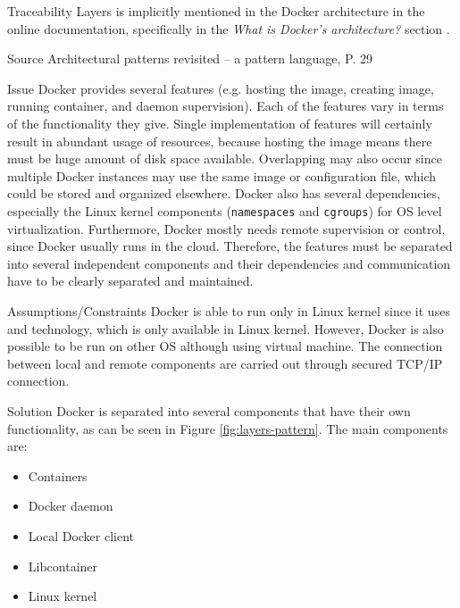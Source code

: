 \begin{patdescription}
\item [Traceability]
Layers is implicitly mentioned in the Docker architecture in the online
documentation, specifically in the \textit{What is Docker’s architecture?}
section \cite{dockerarchi}.

\item [Source]
Architectural patterns revisited -- a pattern language, P. 29
\cite{avgeriou2005architectural}

\item [Issue]
Docker provides several features (e.g. hosting the image, creating image, running container, and daemon supervision). Each of the features vary in terms of the functionality they give. Single implementation of features will certainly result in abundant usage of resources, because hosting the image means there must be huge amount of disk space available.
%
Overlapping may also occur since multiple Docker instances may use the same image or configuration file, which could be stored and organized elsewhere. Docker also has several dependencies, especially the Linux kernel components (\texttt{namespaces} and \texttt{cgroups}) for OS level virtualization.
Furthermore, Docker mostly needs remote supervision or control, since Docker usually runs in the cloud. Therefore, the features must be separated into several independent components and their dependencies and communication have to be clearly separated and maintained.

\item [Assumptions/Constraints]
 Docker is able to run only in Linux kernel since it uses  and  technology, which is only available in Linux kernel. However, Docker is also possible to be run on other OS although using virtual machine. The connection between local and remote components are carried out through secured TCP/IP connection. 

\item [Solution]
Docker is separated into several components that have their own functionality, as can be seen in Figure \ref{fig:layers-pattern}. The main components are:
\begin{itemize}
    \item Containers
    \item Docker daemon
    \item Local Docker client
    \item Libcontainer
    \item Linux kernel
\end{itemize}


\end{patdescription}
